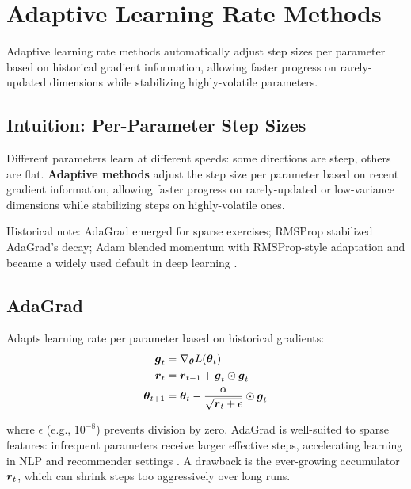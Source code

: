 
\section{Adaptive Learning Rate Methods }
\label{sec:adaptive-methods}

Adaptive learning rate methods automatically adjust step sizes per parameter based on historical gradient information, allowing faster progress on rarely-updated dimensions while stabilizing highly-volatile parameters.

\subsection{Intuition: Per-Parameter Step Sizes}

Different parameters learn at different speeds: some directions are steep, others are flat. \textbf{Adaptive methods} adjust the step size per parameter based on recent gradient information, allowing faster progress on rarely-updated or low-variance dimensions while stabilizing steps on highly-volatile ones.

Historical note: AdaGrad emerged for sparse exercises; RMSProp stabilized AdaGrad's decay; Adam blended momentum with RMSProp-style adaptation and became a widely used default in deep learning \cite{Duchi2011,Tieleman2012,Kingma2014,GoodfellowEtAl2016}.

\subsection{AdaGrad}

Adapts learning rate per parameter based on historical gradients:
\begin{align}
\boldsymbol{g}_t &= \nabla_{\boldsymbol{\theta}} L(\boldsymbol{\theta}_t) \\
\boldsymbol{r}_t &= \boldsymbol{r}_{t-1} + \boldsymbol{g}_t \odot \boldsymbol{g}_t \\
\boldsymbol{\theta}_{t+1} &= \boldsymbol{\theta}_t - \frac{\alpha}{\sqrt{\boldsymbol{r}_t + \epsilon}} \odot \boldsymbol{g}_t
\end{align}

where $\epsilon$ (e.g., $10^{-8}$) prevents division by zero. AdaGrad is well-suited to sparse features: infrequent parameters receive larger effective steps, accelerating learning in NLP and recommender settings \cite{Duchi2011,WebOptimizationDLBook,D2LChapterOptimization}. A drawback is the ever-growing accumulator \(\boldsymbol{r}_t\), which can shrink steps too aggressively over long runs.

